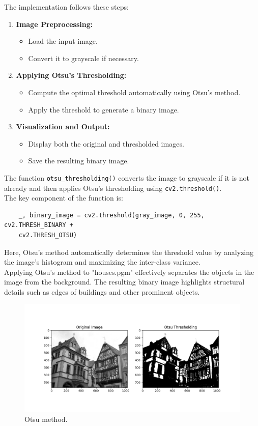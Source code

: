 The implementation follows these steps:
\begin{enumerate}
    \item \textbf{Image Preprocessing:} 
    \begin{itemize}
        \item Load the input image.
        \item Convert it to grayscale if necessary.
    \end{itemize}
    \item \textbf{Applying Otsu’s Thresholding:}
    \begin{itemize}
        \item Compute the optimal threshold automatically using Otsu’s method.
        \item Apply the threshold to generate a binary image.
    \end{itemize}
    \item \textbf{Visualization and Output:}
    \begin{itemize}
        \item Display both the original and thresholded images.
        \item Save the resulting binary image.
    \end{itemize}
\end{enumerate}

The function \texttt{otsu\_thresholding()} converts the image to grayscale if it is not already and then applies Otsu’s thresholding using \texttt{cv2.threshold()}. \\
The key component of the function is:
\begin{verbatim}
    _, binary_image = cv2.threshold(gray_image, 0, 255, cv2.THRESH_BINARY +
    cv2.THRESH_OTSU)
\end{verbatim}

Here, Otsu’s method automatically determines the threshold value by analyzing the image’s histogram and maximizing the inter-class variance. \\
Applying Otsu’s method to "houses.pgm" effectively separates the objects in the image from the background. The resulting binary image highlights structural details such as edges of buildings and other prominent objects.
\begin{figure}[H]
    \centering
    \includegraphics[width=\linewidth]{Assignment4/Images/otsu_thresholding-2.png}
    \caption{Otsu method.}
    \label{fig:enter-label}
\end{figure}

